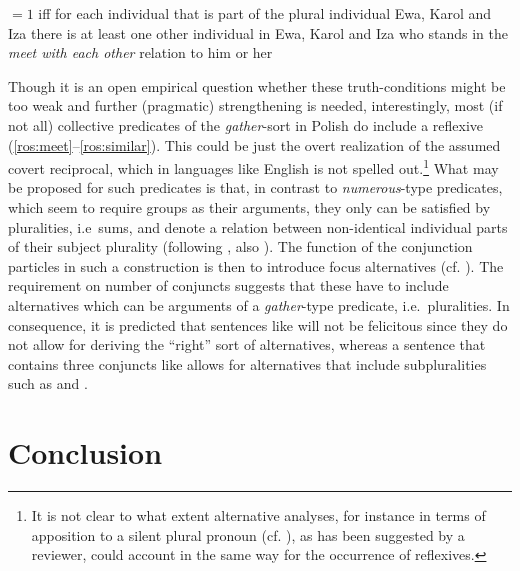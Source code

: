 \documentclass[output=paper]{langscibook}
\begin{document}
\eanoraggedright\label{ros:hackl1}
${ }
= 1 $ iff for each individual that is part of the plural individual Ewa, Karol and Iza there is at least one other individual in Ewa, Karol and Iza who stands in the \textit{meet with each other} relation to him or her
\z

\noindent Though it is an open empirical question whether these truth-conditions might be too weak and further (pragmatic) strengthening is needed, interestingly, most (if not all) collective predicates of the \textit{gather}-sort in Polish do include a reflexive (\ref{ros:meet}--\ref{ros:similar}). This could be just the overt realization of the assumed covert reciprocal, which in languages like English is not spelled out.\footnote{It is not clear to what extent alternative analyses, for instance in terms of apposition to a silent plural pronoun (cf. \citealt{Dikken:2001, Citko:2004}), as has been suggested by a reviewer, could account in the same way for the occurrence of reflexives.} What may be proposed for such predicates is that, in contrast to \textit{numerous}-type predicates, which seem to require groups as their arguments, they only can be satisfied by pluralities, i.e~sums, and denote a relation between non-identical individual parts of their subject plurality (following \citealt{Hackl:2002}, also \citealt{Krifka:1986, Sternefeld:1998, Beck:1999, Beck:2001}). The function of the conjunction particles in such a construction is then to introduce focus alternatives (cf. \citealt{Rooth:1992}). The requirement on number of conjuncts suggests that these have to include alternatives which can be arguments of a \textit{gather}-type predicate, i.e.~pluralities. In consequence, it is predicted that sentences like  will not be felicitous since they do not allow for deriving the ``right'' sort of alternatives, whereas a sentence that contains three conjuncts like  allows for alternatives that include subpluralities such as  and .  

\section{Conclusion}\label{ros:sec:6}
\end{document}
